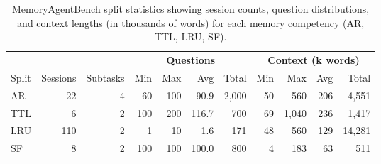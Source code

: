 \begin{table}[t]\centering
\caption{MemoryAgentBench split statistics showing session counts, question distributions, and context lengths (in thousands of words) for each memory competency (AR, TTL, LRU, SF).}
\vspace{-3mm}
\label{tab:memory-bench}
\footnotesize
\begin{tabular}{l r r | rrrr | rrrr}
\toprule
 & & & \multicolumn{4}{c|}{\textbf{Questions}} & \multicolumn{4}{c}{\textbf{Context (k words)}} \\
Split & Sessions & Subtasks & Min & Max & Avg & Total & Min & Max & Avg & Total \\
\midrule
AR & 22 & 4 & 60 & 100 & 90.9 & 2,000 & 50 & 560 & 206 & 4,551 \\
TTL & 6 & 2 & 100 & 200 & 116.7 & 700 & 69 & 1,040 & 236 & 1,417 \\
LRU & 110 & 2 & 1 & 10 & 1.6 & 171 & 48 & 560 & 129 & 14,281 \\
SF & 8 & 2 & 100 & 100 & 100.0 & 800 & 4 & 183 & 63 & 511 \\
\bottomrule
\end{tabular}
\vspace{-2mm}
\end{table}